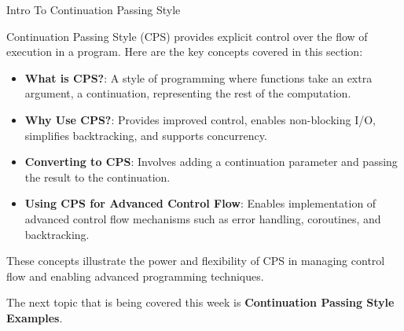 \begin{notes}{Intro To Continuation Passing Style}
\begin{highlight}
    \end{highlight}
    
    \begin{highlight}
    
        Continuation Passing Style (CPS) provides explicit control over the flow of execution in a program. Here are the key concepts covered in this section:
    
        \begin{itemize}
            \item \textbf{What is CPS?}: A style of programming where functions take an extra argument, a continuation, representing the rest of the computation.
            \item \textbf{Why Use CPS?}: Provides improved control, enables non-blocking I/O, simplifies backtracking, and supports concurrency.
            \item \textbf{Converting to CPS}: Involves adding a continuation parameter and passing the result to the continuation.
            \item \textbf{Using CPS for Advanced Control Flow}: Enables implementation of advanced control flow mechanisms such as error handling, coroutines, and backtracking.
        \end{itemize}
    
        These concepts illustrate the power and flexibility of CPS in managing control flow and enabling advanced programming techniques.
    
    \end{highlight}
\end{notes}

The next topic that is being covered this week is \textbf{Continuation Passing Style Examples}.

